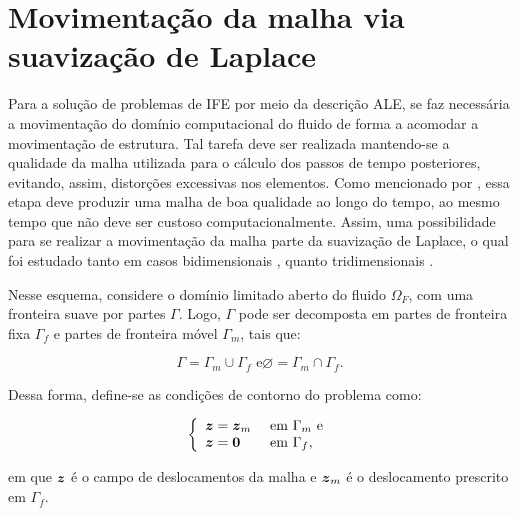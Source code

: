 \chapter{Movimentação da malha via suavização de Laplace} \label{MovMalha}

Para a solução de problemas de IFE por meio da descrição ALE, se faz necessária a movimentação do domínio computacional do fluido de forma a acomodar a movimentação de estrutura. Tal tarefa deve ser realizada mantendo-se a qualidade da malha utilizada para o cálculo dos passos de tempo posteriores, evitando, assim, distorções excessivas nos elementos. Como mencionado por , essa etapa deve produzir uma malha de boa qualidade ao longo do tempo, ao mesmo tempo que não deve ser custoso computacionalmente. Assim, uma possibilidade para se realizar a movimentação da malha parte da suavização de Laplace, o qual foi estudado tanto em casos bidimensionais \cite{masud2007adaptive}, quanto tridimensionais \cite{kanchi20073d}.

Nesse esquema, considere o domínio limitado aberto do fluido $\Omega_F$, com uma fronteira suave por partes $\Gamma$. Logo, $\Gamma$ pode ser decomposta em partes de fronteira fixa $\Gamma_f$ e partes de fronteira móvel $\Gamma_m$, tais que:

\begin{subequations}
    \begin{equation}
        \Gamma=\Gamma_m\cup\Gamma_f\text{ e}
    \end{equation}
    \begin{equation}
        \varnothing=\Gamma_m\cap\Gamma_f\text{.}
    \end{equation}
\end{subequations}

Dessa forma, define-se as condições de contorno do problema como:

\begin{equation}
    \left\{
    \begin{array}{ll}
        \boldsymbol{z}=\boldsymbol{z}_m & \text{ em }\Gamma_m\text{ e} \\
        \boldsymbol{z}=\boldsymbol{0}   & \text{ em }\Gamma_f\text{,}
    \end{array}
    \right.
\end{equation}

\noindent em que $\boldsymbol{z}$ é o campo de deslocamentos da malha e $\boldsymbol{z}_m$ é o deslocamento prescrito em $\Gamma_f$.

